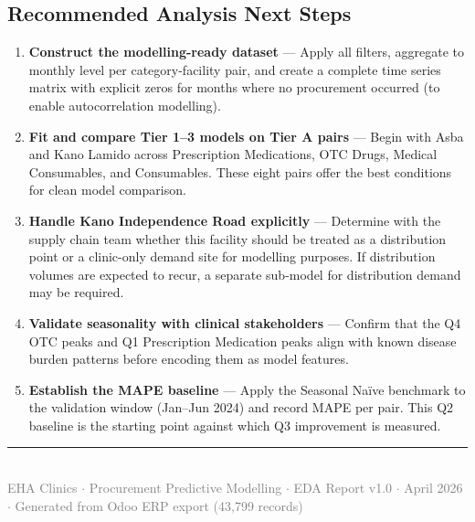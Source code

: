 \documentclass[12pt, a4paper]{article}
\begin{document}
\subsection{Recommended Analysis Next Steps}

\begin{enumerate}[leftmargin=1.5em, itemsep=6pt]
  \item \textbf{Construct the modelling-ready dataset} --- Apply all filters,
        aggregate to monthly level per category-facility pair, and create a
        complete time series matrix with explicit zeros for months where
        no procurement occurred (to enable autocorrelation modelling).

  \item \textbf{Fit and compare Tier 1--3 models on Tier A pairs} --- Begin
        with Asba and Kano Lamido across Prescription Medications, OTC Drugs,
        Medical Consumables, and Consumables. These eight pairs offer the
        best conditions for clean model comparison.

  \item \textbf{Handle Kano Independence Road explicitly} --- Determine with
        the supply chain team whether this facility should be treated as a
        distribution point or a clinic-only demand site for modelling purposes.
        If distribution volumes are expected to recur, a separate sub-model
        for distribution demand may be required.

  \item \textbf{Validate seasonality with clinical stakeholders} --- Confirm
        that the Q4 OTC peaks and Q1 Prescription Medication peaks align with
        known disease burden patterns before encoding them as model features.

  \item \textbf{Establish the MAPE baseline} --- Apply the Seasonal Na\"{i}ve
        benchmark to the validation window (Jan--Jun 2024) and record MAPE per
        pair. This Q2 baseline is the starting point against which Q3
        improvement is measured.
\end{enumerate}

\vfill

\noindent\textcolor{ehaBlue!40!white}{\rule{\textwidth}{0.4pt}}\\[0.4em]
{\small\textcolor{gray}{EHA Clinics $\cdot$ Procurement Predictive Modelling $\cdot$
EDA Report v1.0 $\cdot$ April 2026 $\cdot$ Generated from Odoo ERP export (43,799 records)}}
\end{document}

